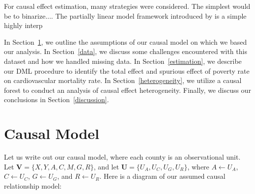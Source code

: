 \documentclass{article}
\theoremstyle{plain}
\theoremstyle{definition}
\theoremstyle{remark}
\begin{document}
For causal effect estimation, many strategies were considered.
The simplest would be to binarize....
The partially linear model framework introduced by \citet{chernozhukov2018double} is a simple highly interp

In Section~\ref{causal_model}, we outline the assumptions of our causal model on which we based our analysis. In 
Section~\ref{data}, we discuss some challenges encountered with this dataset and how we handled missing data. In 
Section~\ref{estimation}, we describe our DML procedure
to identify the total effect and spurious effect of poverty rate on cardiovascular mortality rate. In
Section~\ref{heterogeneity}, we utilize a causal 
forest to conduct an analysis of causal effect heterogeneity. Finally, we discuss our conclusions
in Section~\ref{discussion}.


\section{Causal Model}
\label{causal_model}

Let us write out our causal model, where each county is an observational unit.
Let $\mathbf V = \{X, Y, A, C, M, G, R\}$, and
let $\mathbf  U = \{U_A, U_C,U_G,U_R\}$,
where $A \leftarrow U_A$, $C \leftarrow U_C$,
$G \leftarrow U_G$, and $R \leftarrow U_R$.
Here is a diagram of our assumed causal relationship
model:

\centering
{}
\end{document}
